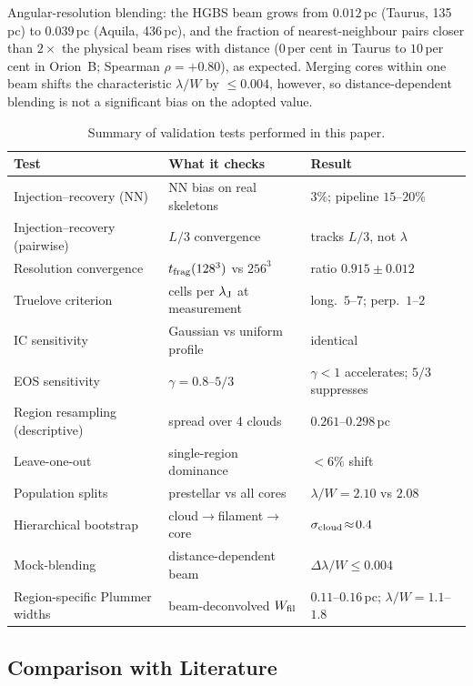 \documentclass[usenatbib,twoside,twocolumn]{mnras}
\begin{document}
Angular-resolution blending: the HGBS beam grows from $0.012$\,pc (Taurus, 135\,pc) to $0.039$\,pc (Aquila, 436\,pc), and the fraction of nearest-neighbour pairs closer than $2\times$ the physical beam rises with distance ($0$\,per cent in Taurus to $10$\,per cent in Orion~B; Spearman $\rho=+0.80$), as expected. Merging cores within one beam shifts the characteristic $\lambda/W$ by $\le0.004$, however, so distance-dependent blending is not a significant bias on the adopted value.

\begin{table}
\caption{Summary of validation tests performed in this paper.}
\label{tab:validation_summary}
\footnotesize
\setlength{\tabcolsep}{3pt}
\begin{tabular}{p{2.4cm}p{2.8cm}p{2.0cm}}
\toprule
Test & What it checks & Result \\
\midrule
Injection--recovery (NN) & NN bias on real skeletons & $3\%$; pipeline $15$--$20\%$ \\
Injection--recovery (pairwise) & $L/3$ convergence & tracks $L/3$, not $\lambda$ \\
Resolution convergence & $t_{\rm frag}(128^3)$ vs $256^3$ & ratio $0.915\pm0.012$ \\
Truelove criterion & cells per $\lambda_{\rm J}$ at measurement & long.\ $5$--$7$; perp.\ $1$--$2$ \\
IC sensitivity & Gaussian vs uniform profile & identical \\
EOS sensitivity & $\gamma=0.8$--$5/3$ & $\gamma<1$ accelerates; $5/3$ suppresses \\
Region resampling (descriptive) & spread over 4 clouds & $0.261$--$0.298$\,pc \\
Leave-one-out & single-region dominance & $<6\%$ shift \\
Population splits & prestellar vs all cores & $\lambda/W\!=\!2.10$ vs $2.08$ \\
Hierarchical bootstrap & cloud$\to$filament$\to$core & $\sigma_{\rm cloud}\!\approx\!0.4$ \\
Mock-blending & distance-dependent beam & $\Delta\lambda/W\!\le\!0.004$ \\
Region-specific Plummer widths & beam-deconvolved $W_{\rm fil}$ & $0.11$--$0.16$\,pc; $\lambda/W\!=\!1.1$--$1.8$ \\
\bottomrule
\end{tabular}
\end{table}

\subsection{Comparison with Literature}
\end{document}
